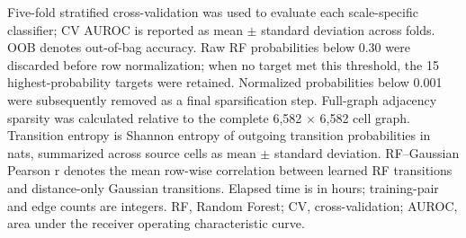 Five-fold stratified cross-validation was used to evaluate each scale-specific classifier; CV AUROC is reported as mean \(\pm\) standard deviation across folds. OOB denotes out-of-bag accuracy. Raw RF probabilities below 0.30 were discarded before row normalization; when no target met this threshold, the 15 highest-probability targets were retained. Normalized probabilities below 0.001 were subsequently removed as a final sparsification step. Full-graph adjacency sparsity was calculated relative to the complete 6,582 \(\times\) 6,582 cell graph. Transition entropy is Shannon entropy of outgoing transition probabilities in nats, summarized across source cells as mean \(\pm\) standard deviation. RF--Gaussian Pearson r denotes the mean row-wise correlation between learned RF transitions and distance-only Gaussian transitions. Elapsed time is in hours; training-pair and edge counts are integers. RF, Random Forest; CV, cross-validation; AUROC, area under the receiver operating characteristic curve.